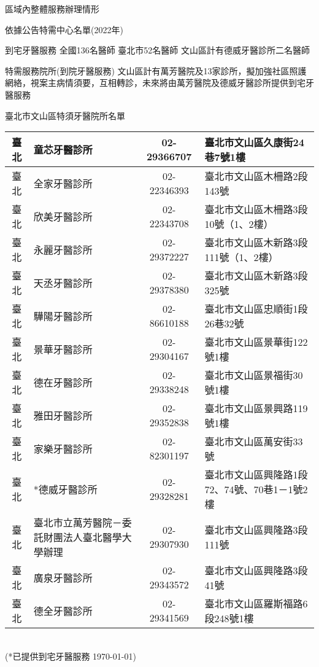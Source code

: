 \clearpage
區域內整體服務辦理情形

依據公告特需中心名單(2022年)
\begin{outline}

\1 到宅牙醫服務
\2 全國136名醫師
\2 臺北市52名醫師
\2 文山區計有德威牙醫診所二名醫師 %

\1 特需服務院所(到院牙醫服務)
\2 文山區計有萬芳醫院及13家診所，擬加強社區照護網絡，視案主病情須要，互相轉診，未來將由萬芳醫院及德威牙醫診所提供到宅牙醫服務
\end{outline}

臺北市文山區特須牙醫院所名單\\
\begin{tabularx}{1.0625\textwidth}{|c|p{3.2cm}|c|l|}
\hline
臺北&	童芯牙醫診所&	02-29366707 &	臺北市文山區久康街24巷7號1樓\\
\hline
臺北&	全家牙醫診所&	02-22346393 &	臺北市文山區木柵路2段143號\\
\hline
臺北 &	欣美牙醫診所 &	02-22343708 &	臺北市文山區木柵路3段10號（1、2樓）\\
\hline
臺北 &	永麗牙醫診所 &	02-29372227 &	臺北市文山區木新路3段111號（1、2樓）\\
\hline
臺北 &	天丞牙醫診所 &	02-29378380 &	臺北市文山區木新路3段325號\\
\hline
臺北 &	驊陽牙醫診所 &	02-86610188 &	臺北市文山區忠順街1段26巷32號\\
\hline
臺北 &	景華牙醫診所 &	02-29304167 &	臺北市文山區景華街122號1樓\\
\hline
臺北 &	德在牙醫診所 &	02-29338248 &	臺北市文山區景福街30號1樓\\
\hline
臺北 &	雅田牙醫診所 &	02-29352838 &	臺北市文山區景興路119號1樓\\
\hline
臺北 &	家樂牙醫診所 &	02-82301197 &	臺北市文山區萬安街33號\\
\hline
臺北 &	*德威牙醫診所 &	02-29328281 &	臺北市文山區興隆路1段72、74號、70巷1－1號2樓\\
\hline
臺北 &	臺北市立萬芳醫院－委託財團法人臺北醫學大學辦理
&	02-29307930 &	臺北市文山區興隆路3段111號\\
\hline
臺北 &	廣泉牙醫診所 &	02-29343572 &	臺北市文山區興隆路3段41號\\
\hline
臺北 &	德全牙醫診所 &	02-29341569 &	臺北市文山區羅斯福路6段248號1樓\\
\hline
\end{tabularx}\\
(*已提供到宅牙醫服務 \today)

